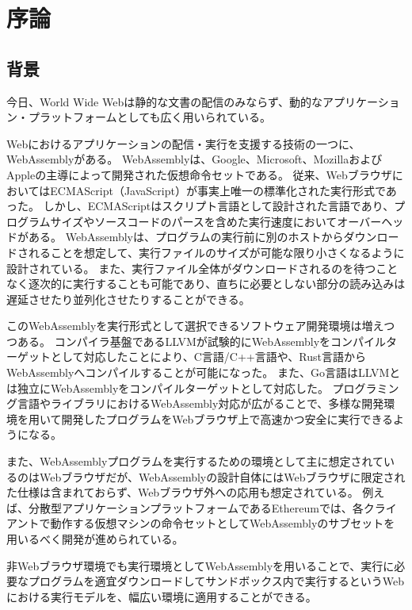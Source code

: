 \chapter{序論}
\label{chap:introduction}

\section{背景}
\label{section:background}

今日、World Wide Webは静的な文書の配信のみならず、動的なアプリケーション・プラットフォームとしても広く用いられている。

Webにおけるアプリケーションの配信・実行を支援する技術の一つに、WebAssemblyがある。
WebAssemblyは、Google、Microsoft、MozillaおよびAppleの主導によって開発された仮想命令セットである\cite{webassembly}。
従来、WebブラウザにおいてはECMAScript（JavaScript）が事実上唯一の標準化された実行形式であった。
しかし、ECMAScriptはスクリプト言語として設計された言語であり\cite{ecma2018}、プログラムサイズやソースコードのパースを含めた実行速度においてオーバーヘッドがある。
WebAssemblyは、プログラムの実行前に別のホストからダウンロードされることを想定して、実行ファイルのサイズが可能な限り小さくなるように設計されている。
また、実行ファイル全体がダウンロードされるのを待つことなく逐次的に実行することも可能であり、直ちに必要としない部分の読み込みは遅延させたり並列化させたりすることができる。

このWebAssemblyを実行形式として選択できるソフトウェア開発環境は増えつつある。
コンパイラ基盤であるLLVMが試験的にWebAssemblyをコンパイルターゲットとして対応した\cite{}ことにより、C言語/C++言語や、Rust言語\cite{rust_wasm}からWebAssemblyへコンパイルすることが可能になった。
また、Go言語はLLVMとは独立にWebAssemblyをコンパイルターゲットとして対応した\cite{go_wasm}。
プログラミング言語やライブラリにおけるWebAssembly対応が広がることで、多様な開発環境を用いて開発したプログラムをWebブラウザ上で高速かつ安全に実行できるようになる。

また、WebAssemblyプログラムを実行するための環境として主に想定されているのはWebブラウザだが、WebAssemblyの設計自体にはWebブラウザに限定された仕様は含まれておらず、Webブラウザ外への応用も想定されている。
例えば、分散型アプリケーションプラットフォームであるEthereum\cite{ethereum}では、各クライアントで動作する仮想マシンの命令セットとしてWebAssemblyのサブセットを用いるべく開発が進められている\cite{ewasm}。

非Webブラウザ環境でも実行環境としてWebAssemblyを用いることで、実行に必要なプログラムを適宜ダウンロードしてサンドボックス内で実行するというWebにおける実行モデルを、幅広い環境に適用することができる。

